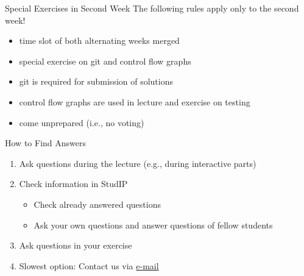 \begin{frame}{\insertsubsection}
	\begin{fancycolumns}
		\begin{definition}{Special Exercises in Second Week}
			The following rules apply only to the second week!
			\begin{itemize}
				\item time slot of both alternating weeks merged
				\item special exercise on git and control flow graphs
				\item git is required for submission of solutions
				\item control flow graphs are used in lecture and exercise on testing
				\item come unprepared (i.e., no voting)
			\end{itemize}
		\end{definition}
		\nextcolumn
		\begin{note}{How to Find Answers}
			\begin{enumerate}
				\item Ask questions during the lecture (e.g., during interactive parts)
				\item Check information in StudIP
				\begin{itemize}
					\item Check already answered questions
					\item Ask your own questions and answer questions of fellow students
				\end{itemize}
				\item Ask questions in your exercise
				\item Slowest option: Contact us via  \href{mailto:christopher.rau@tu-braunschweig.de?cc=thomas.thuem@tu-braunschweig.de&subject=[SE1]}{e-mail}
			\end{enumerate}
		\end{note}
	\end{fancycolumns}
\end{frame}

